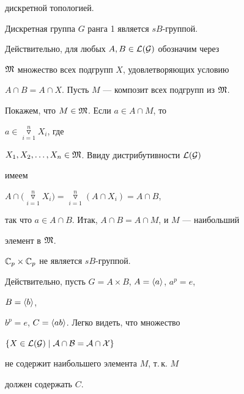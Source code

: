 дискретной топологией. 


 


\begin{exam} 


Дискретная группа $G$ ранга 1 является $sB$-группой. 


\end{exam} 


 


Действительно, для любых $A,B\in\cal L(G)$ обозначим через  


$\frak M$ множество всех подгрупп $X$, удовлетворяющих условию  


$A\cap B=A\cap X$. Пусть $M$ --- композит всех подгрупп из $\frak M$.  


Покажем, что $M\in\frak M$. Если $a\in A\cap M$, то 


$a\in\mathop{\triangledown}\limits_{i=1}^n X_i$, где 


$X_1,X_2,\dotsc,X_n\in\frak M$. Ввиду дистрибутивности $\cal L(G)$ 


имеем 


$A\cap\Big(\mathop{\triangledown}\limits_{i=1}^n X_i\Big)= 


\mathop{\triangledown}\limits_{i=1}^n(A\cap X_i)=A\cap B$, 


так что $a\in A\cap B$. Итак, $A\cap B=A\cap M$, и $M$ --- наибольший  


элемент в $\frak M$. 


 


\begin{exam} 


$\Bbb C_p\times\Bbb C_p$ не является $sB$-группой. 


\end{exam} 


 


Действительно, пусть $G=A\times B$, $A=\langle a\rangle$, $a^p=e$, 


$B=\langle b\rangle$, 


$b^p=e$, $C=\langle ab\rangle$. Легко видеть, что множество 


$\{X\in\cal L(G)\mid A\cap B=A\cap X\}$ 


не содержит наибольшего элемента $M$, т.\,к. $M$ 


должен содержать $C$. 


 


